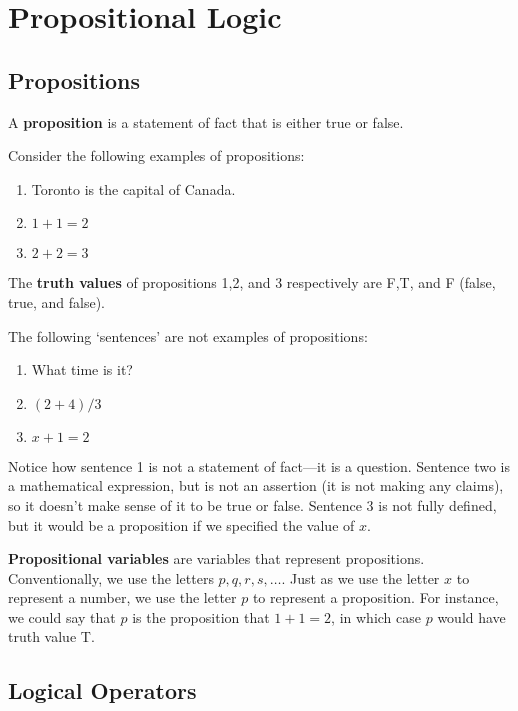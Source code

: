 \section{Propositional Logic}
\subsection{Propositions}
\begin{defn}
  A \textbf{proposition} is a statement of fact that is either true or
  false.
\end{defn}

\begin{example}
  Consider the following examples of propositions:
  \begin{enumerate}
  \item Toronto is the capital of Canada.
  \item $1+1=2$
  \item $2+2=3$
  \end{enumerate}
\end{example}

The \textbf{truth values} of propositions 1,2, and 3 respectively are F,T, and F (false, true, and false).

\begin{example}
  The following `sentences' are not examples of propositions:
  \begin{enumerate}
  \item What time is it?
  \item $(2+4)/3$
  \item $x+1=2$
  \end{enumerate}
\end{example}

Notice how sentence 1 is not a statement of fact---it is a
question. Sentence two is a mathematical expression, but is not an
assertion (it is not making any claims), so it doesn't make sense of it to
be true or false. Sentence $3$ is not fully defined, but it would be a
proposition if we specified the value of $x$.

\textbf{Propositional variables} are variables that represent
propositions. Conventionally, we use the letters $p,q,r,s,\dots$. Just as
we use the letter $x$ to represent a number, we use the letter $p$ to
represent a proposition. For instance, we could say that $p$ is the
proposition that $1+1=2$, in which case $p$ would have truth value T.

\subsection{Logical Operators}

